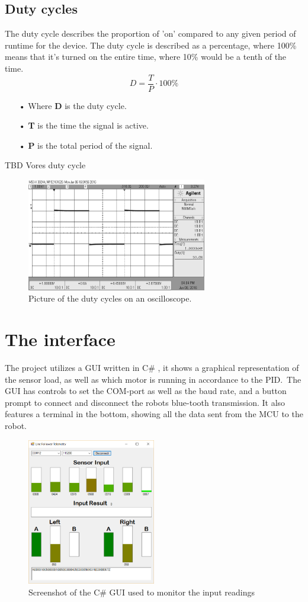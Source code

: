 \newpage
\subsection{Duty cycles}
The duty cycle describes the proportion of 'on' compared to any given period of runtime for the device. The duty cycle is described as a percentage, where 100\% means that it's turned on the entire time, where 10\% would be a tenth of the time.\\
$${D}=\frac{T}{P} \cdot 100\%$$ 

\begin{enumerate}
\item[•]Where {\textbf{D}} is the duty cycle. 
\item[•]{\textbf{T}} is the time the signal is active.
\item[•]{\textbf{P}} is the total period of the signal.
\end{enumerate}
TBD Vores duty cycle


\begin{figure}[h!]
  \centering
  \includegraphics[width=0.7\textwidth]{figures/f1000d50.png}  
\caption{Picture of the duty cycles on an oscilloscope.}  
  \label{Duty cycles}
\end{figure}
\newpage

\section{The interface}
The project utilizes a GUI written in C\# , it shows a graphical representation of the sensor load, as well as which motor is running in accordance to the PID.\
The GUI has controls to set the COM-port as well as the baud rate, and a button prompt to connect and disconnect the robots blue-tooth transmission. It also features a terminal in the bottom, showing all the data sent from the MCU to the robot.

\begin{figure}[h!]
  \centering
  \includegraphics[width=0.5\textwidth]{figures/sensorsonwhite.png}  
\caption{Screenshot of the C\# GUI used to monitor the input readings}  
  \label{The GUI}
\end{figure}